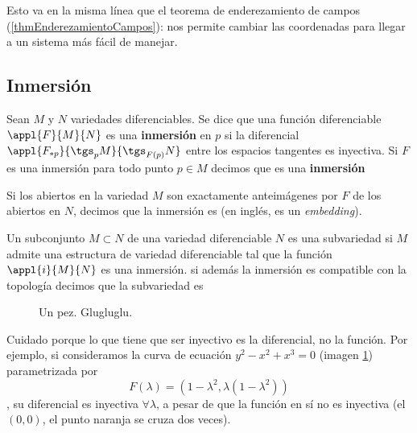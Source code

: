 Esto va en la misma línea que el teorema de enderezamiento de campos (\ref{thmEnderezamientoCampos}): nos permite cambiar las coordenadas para llegar a un sistema más fácil de manejar.

\subsection{Inmersión}
\begin{defn}[Inmersión] Sean $M$ y $N$ variedades diferenciables. Se dice que una función diferenciable $\appl{F}{M}{N}$ es una \textbf{inmersión} en $p$ si la diferencial $\appl{F_{*p}}{\tgs_pM}{\tgs_{F(p)}N}$ entre los espacios tangentes es inyectiva. Si $F$ es una inmersión para todo punto $p\in M$ decimos que es una \textbf{inmersión}
\end{defn}

Si los abiertos en la variedad $M$ son exactamente anteimágenes por $F$ de los abiertos en $N$, decimos que la inmersión es  (en inglés, es un \textit{embedding}).

Un subconjunto $M \subset N$ de una variedad diferenciable $N$ es una subvariedad si $M$ admite una estructura de variedad diferenciable tal que la función $\appl{i}{M}{N}$ es una inmersión. si además la inmersión es compatible con la topología decimos que la subvariedad es 

\begin{example}

\begin{figure}[hbtp]
\centering
{}
\caption{Un pez. Glugluglu.}
\label{figPez}
\end{figure}

Cuidado porque lo que tiene que ser inyectivo es la diferencial, no la función. Por ejemplo, si consideramos la curva de ecuación $y^2 - x^2 + x^3 = 0$ (imagen \ref{figPez}) parametrizada por \[ F(λ) = (1-λ^2, λ(1-λ^2)) \], su diferencial es inyectiva $∀λ$, a pesar de que la función en sí no es inyectiva (el $(0,0)$, el punto naranja se cruza dos veces).
\end{example}


